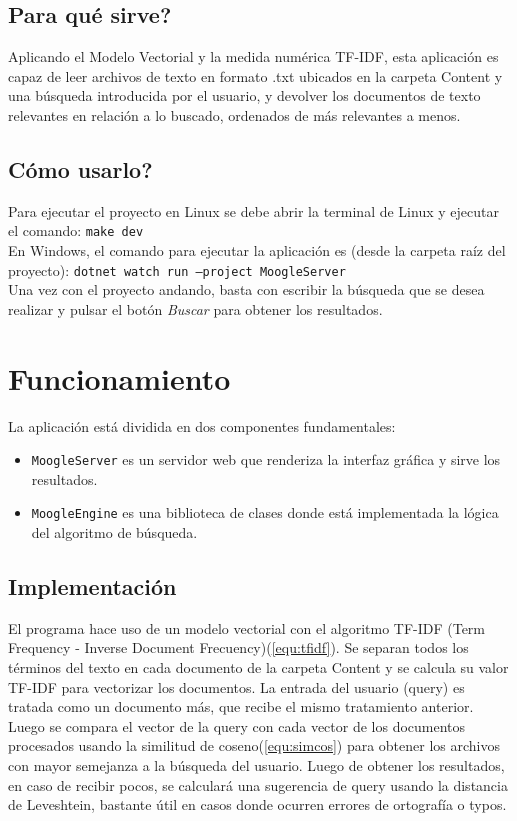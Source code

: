\documentclass[12pt,a4paper]{article}
\begin{document}
\subsection{Para qué sirve?}\label{sub:why}
Aplicando el Modelo Vectorial y la medida numérica TF-IDF, esta aplicación es capaz de leer 
archivos de texto en formato .txt ubicados en la carpeta Content y una búsqueda introducida por el usuario, y
devolver los documentos de texto relevantes en relación a lo buscado, 
ordenados de más relevantes a menos.
\subsection{Cómo usarlo?}\label{sub:how}
Para ejecutar el proyecto en Linux se debe abrir la terminal de Linux y ejecutar el comando:
\texttt{make dev}\\
En Windows, el comando para ejecutar la aplicación es (desde la carpeta raíz del proyecto):
\texttt{dotnet watch run --project MoogleServer}\\
Una vez con el proyecto andando, basta con escribir la búsqueda que se desea
realizar y pulsar el botón \textit{Buscar} para obtener los resultados.


\section{Funcionamiento}\label{sec:func}
La aplicación está dividida en dos componentes fundamentales:
\begin{itemize}
    \item \texttt{MoogleServer} es un servidor web que renderiza la interfaz gráfica y sirve los resultados.
    \item \texttt{MoogleEngine} es una biblioteca de clases donde está implementada la lógica del algoritmo de búsqueda.
\end{itemize}
\subsection{Implementación}\label{sub:impl}
El programa hace uso de un modelo vectorial con el algoritmo TF-IDF (Term Frequency - Inverse Document Frecuency)(\ref{equ:tfidf}).
Se separan todos los términos del texto en cada documento de la carpeta Content y se calcula
su valor TF-IDF para vectorizar los documentos. La entrada del usuario (query)
es tratada como un documento más, que recibe el mismo tratamiento anterior. Luego se compara el vector de la query con cada
vector de los documentos procesados usando la similitud de coseno(\ref{equ:simcos}) para obtener los archivos con
mayor semejanza a la búsqueda del usuario. Luego de obtener los resultados, en caso de recibir pocos, se calculará una sugerencia
de query usando la distancia de Leveshtein, bastante útil en casos donde ocurren errores de ortografía o typos.
\end{document}
